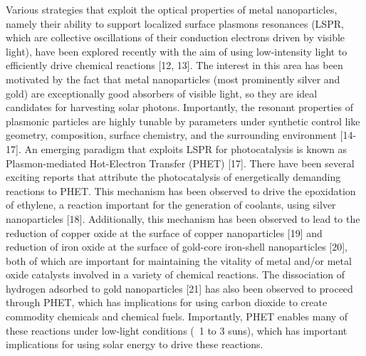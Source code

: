 \documentclass[journal=jacsat,manuscript=article]{achemso}
\begin{document}
Various strategies that exploit the optical properties of metal nanoparticles, namely their ability to support localized surface plasmons resonances (LSPR, which are collective oscillations of their conduction electrons driven by visible light), have been explored recently with the aim of using low-intensity light to efficiently drive chemical reactions [12, 13].  The interest in this area has been motivated by the fact that metal nanoparticles (most prominently silver and gold) are exceptionally good absorbers of visible light, so they are ideal candidates for harvesting solar photons.  Importantly, the resonant properties of plasmonic particles are highly tunable by parameters under synthetic control like geometry, composition, surface chemistry, and the surrounding environment [14-17].  An emerging paradigm that exploits LSPR for photocatalysis is known as Plasmon-mediated Hot-Electron Transfer (PHET) [17].  There have been several exciting reports that attribute the photocatalysis of energetically demanding reactions to PHET.   This mechanism has been observed to drive the epoxidation of ethylene, a reaction important for the generation of coolants, using silver nanoparticles [18].  Additionally, this mechanism has been observed to lead to the reduction of copper oxide at the surface of copper nanoparticles [19] and reduction of iron oxide at the surface of gold-core iron-shell nanoparticles [20], both of which are important for maintaining the vitality of metal and/or metal oxide catalysts involved in a variety of chemical reactions.   The dissociation of hydrogen adsorbed to gold nanoparticles [21] has also been observed to proceed through PHET, which has implications for using carbon dioxide to create commodity chemicals and chemical fuels.  Importantly, PHET enables many of these reactions under low-light conditions (~1 to 3 suns), which has important implications for using solar energy to drive these reactions.  
\end{document}
